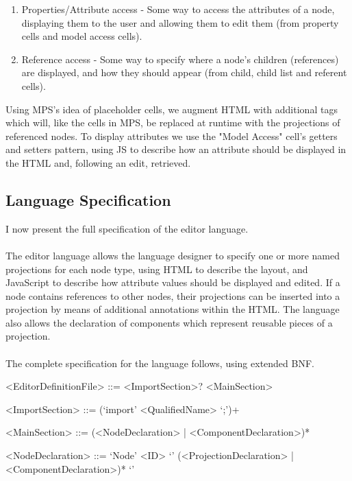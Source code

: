 \documentclass{article}
\begin{document}
{\begin{enumerate}
\item Properties/Attribute access - Some way to access the attributes of a node, displaying them to the user and allowing them to edit them  (from property cells and model access cells).
\item Reference access - Some way to specify where a node's children (references) are displayed, and how they should appear (from child, child list and referent cells).
\end{enumerate}
Using MPS's idea of placeholder cells, we augment HTML with additional tags which will, like the cells in MPS, be replaced at runtime with the projections of referenced nodes. To display attributes we use the "Model Access" cell's getters and setters pattern, using JS to describe how an attribute should be displayed in the HTML and, following an edit, retrieved. 

\subsection{Language Specification}
I now present the full specification of the editor language. 
\\
\\
The editor language allows the language designer to specify one or more named projections for each node type, using HTML to describe the layout, and JavaScript to describe how attribute values should be displayed and edited. If a node contains references to other nodes, their projections can be inserted into a projection by means of additional annotations within the HTML. The language also allows the declaration of components which represent reusable pieces of a projection. 
\\
\\
The complete specification for the language follows, using extended BNF.

\setlength{\grammarparsep}{12pt plus 1pt minus 1pt} %
\setlength{\grammarindent}{5em} %

\begin{grammar}

<EditorDefinitionFile> ::= <ImportSection>? <MainSection>

<ImportSection> ::= (`import' <QualifiedName> `;')+ 

<MainSection> ::= (<NodeDeclaration> | <ComponentDeclaration>)*

<NodeDeclaration> ::= `Node' <ID> `{' (<ProjectionDeclaration> | <ComponentDeclaration>)* `}'


\end{grammar}}
\end{document}
